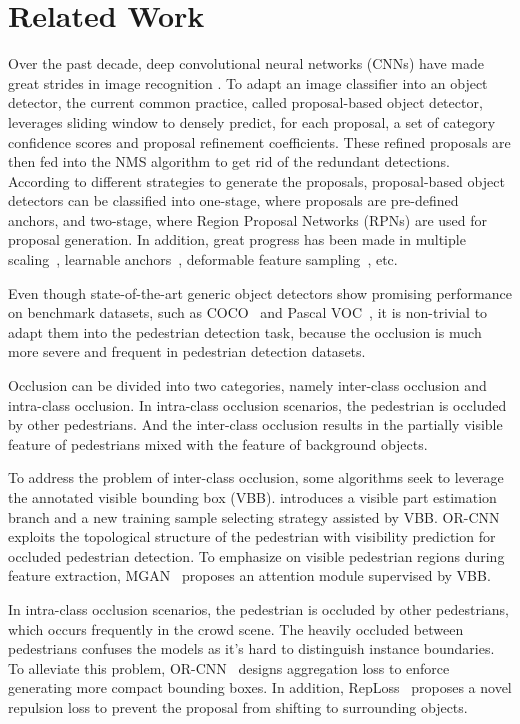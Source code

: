 \documentclass[sigconf]{acmart}
\begin{document}
\section{Related Work}
Over the past decade, deep convolutional neural networks (CNNs) have made great strides in image recognition \cite{resnet}. To adapt an image classifier into an object detector, the current common practice, called proposal-based object detector, leverages sliding window to densely predict, for each proposal, a set of category confidence scores and proposal refinement coefficients. These refined proposals are then fed into the NMS algorithm to get rid of the redundant detections. According to different strategies to generate the proposals, proposal-based object detectors can be classified into one-stage, where proposals are pre-defined anchors, and two-stage, where Region Proposal Networks (RPNs) are used for proposal generation. In addition, great progress has been made in multiple scaling~\cite{fpn, panet}, learnable anchors~\cite{guidedanchor, metaanchor}, deformable feature sampling~\cite{deformable, deformablev2}, etc.

Even though state-of-the-art generic object detectors show promising performance on benchmark datasets, such as COCO~\cite{coco} and Pascal VOC~\cite{pascal}, it is non-trivial to adapt them into the pedestrian detection task, because the occlusion is much more severe and frequent in pedestrian detection datasets.

Occlusion can be divided into two categories, namely inter-class occlusion and intra-class occlusion. In intra-class occlusion scenarios, the pedestrian is occluded by other pedestrians. And the inter-class occlusion results in the partially visible feature of pedestrians mixed with the feature of background objects.

To address the problem of inter-class occlusion, some algorithms \cite{bibox,mgan,orcnn} seek to leverage the annotated visible bounding box (VBB). \cite{bibox} introduces a visible part estimation branch and a new training sample selecting strategy assisted by VBB. OR-CNN~\cite{orcnn} exploits the topological structure of the pedestrian with visibility prediction for occluded pedestrian detection. To emphasize on visible pedestrian regions during feature extraction, MGAN~\cite{mgan} proposes an attention module supervised by VBB.

In intra-class occlusion scenarios, the pedestrian is occluded by other pedestrians, which occurs frequently in the crowd scene. The heavily occluded between pedestrians confuses the models as it's hard to distinguish instance boundaries. To alleviate this problem, OR-CNN~\cite{orcnn} designs aggregation loss to enforce generating more compact bounding boxes. In addition, RepLoss~\cite{repulsion-loss} proposes a novel repulsion loss to prevent the proposal from shifting to surrounding objects. 
\end{document}
